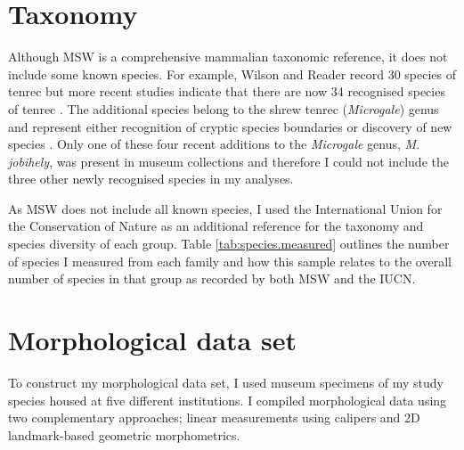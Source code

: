 \section{Taxonomy}

Although MSW is a comprehensive mammalian taxonomic reference, it does not include some known species. For example, Wilson and Reader \citeyearpar{Wilson2005} record 30 species of tenrec but more recent studies indicate that there are now 34 recognised species of tenrec \citep{Olson2013}. The additional species belong to the shrew tenrec (\textit{Microgale}) genus and represent either recognition of cryptic species boundaries \citep{Olson2004} or discovery of new species \citep{Goodman2006, Olson2009}. Only one of these four recent additions to the \textit{Microgale} genus, \textit{M. jobihely}, was present in museum collections and therefore I could not include the three other newly recognised species in my analyses.

As MSW does not include all known species, I used the International Union for the Conservation of Nature \citep{IUCN2012} as an additional reference for the taxonomy and species diversity of each group. Table \ref{tab:species.measured} outlines the number of species I measured from each family and how this sample relates to the overall number of species in that group as recorded by both MSW and the IUCN.


\begin{table}[h]
\caption[Summary of species measured] %
{The number of species I measured in each family compared to the total number of species in that family according to two sources; \citep{Wilson2005} and \citep{IUCN2012}}

\label{tab:species.measured}
\end{table}

\section{Morphological data set}
To construct my morphological data set, I used museum specimens of my study species housed at five different institutions. I compiled morphological data using two complementary approaches; linear measurements using calipers and 2D landmark-based geometric morphometrics.

\subsection{}

